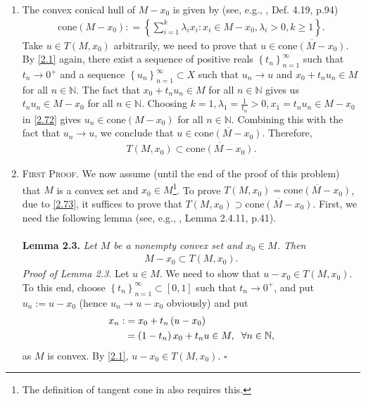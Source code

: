 \documentclass[a4paper]{article}
\numberwithin{equation}{section}
\begin{document}
\begin{enumerate}
\item The convex conical hull of $M-x_0$ is given by (see, e.g., \cite{1}, Def. 4.19, p.94)
\begin{align}
\label{2.72}
\mbox{cone}\left( {M - {x_0}} \right): = \left\{ {\sum\limits_{i = 1}^k {{\lambda _i}{x_i}} :{x_i} \in M - {x_0},{\lambda _i} > 0,k \ge 1} \right\}.
\end{align}
Take $u\in T\left(M,x_0\right)$ arbitrarily, we need to prove that $u \in \overline {\mbox{cone}\left( {M - {x_0}} \right)} $. By \eqref{2.1} again, there exist a sequence of positive reals $\left\{ {{t_n}} \right\}_{n = 1}^\infty $ such that $t_n \to 0^+$ and a sequence $\left\{ {{u_n}} \right\}_{n = 1}^\infty  \subset X$ such that $u_n\to u$ and $x_0+t_n u_n\in M$ for all $n\in \mathbb{N}$. The fact that $x_0+t_nu_n\in M$ for all $n\in \mathbb{N}$ gives us $t_nu_n\in M- {x_0}$ for all $n\in \mathbb{N}$. Choosing $k = 1,{\lambda _1} = \frac{1}{{{t_n}}} > 0,{x_1} = {t_n}{u_n} \in M - {x_0}$ in \eqref{2.72} gives ${u_n} \in \mbox{cone}\left( {M - {x_0}} \right)$ for all $n\in \mathbb{N}$. Combining this with the fact that $u_n\to u$, we conclude that $u \in \overline {\mbox{cone}\left( {M - {x_0}} \right)} $. Therefore,
\begin{align}
\label{2.73}
T\left( {M,{x_0}} \right) \subset \overline {\mbox{cone}\left( {M - {x_0}} \right)} .
\end{align}
\item \textsc{First Proof.} We now assume (until the end of the proof of this problem) that $M$ is a convex set and $x_0\in M$\footnote{The definition of tangent cone in \cite{1} also requires this.}. To prove $T\left( {M,{x_0}} \right) = \overline {\mbox{cone}\left( {M - {x_0}} \right)} $, due to \eqref{2.73}, it suffices to prove that $T\left( {M,{x_0}} \right) \supset \overline {\mbox{cone}\left( {M - {x_0}} \right)} $. First, we need the following lemma (see, e.g., \cite{2}, Lemma 2.4.11, p.41).\\
\\
\textbf{Lemma 2.3.} \textit{Let $M$ be a nonempty convex set and $x_0\in M$. Then}
\begin{align}
M - {x_0} \subset T\left( {M,{x_0}} \right).
\end{align}
\textit{Proof of Lemma 2.3.} Let $u \in M$. We need to show that $u-{x_0} \in T\left(M,x_0\right)$. To this end, choose $\left\{ {{t_n}} \right\}_{n = 1}^\infty  \subset \left[ {0,1} \right]$ such that $t_n\to 0^+$, and put $u_n:=u-x_0$ (hence $u_n\to u-x_0$ obviously) and put
\begin{align}
{x_n}: &= {x_0} + {t_n}\left( {u - {x_0}} \right)\\
 &= \left( {1 - {t_n}} \right){x_0} + {t_n}u \in M ,\hspace{0.2cm} \forall n\in \mathbb{N},
\end{align}
as $M$ is convex. By \eqref{2.1}, $u-{x_0}\in T\left(M,x_0\right)$. \hfill $\square$\\


\end{enumerate}
\end{document}
